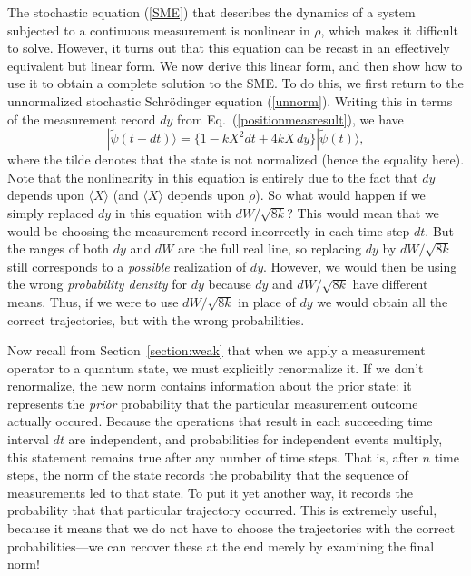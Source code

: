 \documentclass[12pt,aps,onecolum,superscriptaddress,footinbib,floatfix,showpacs]{revtex4-1}
\begin{document}
The stochastic equation (\ref{SME}) that describes the
dynamics of a system subjected to a continuous measurement is
nonlinear in $\rho$, which makes it difficult to solve. However, it turns
out that this equation can be recast in an effectively
equivalent but linear form. We now derive this linear form, and then show 
how to use it to obtain a complete solution to the SME. To do this, we first 
return to the unnormalized stochastic Schr\"{o}dinger 
equation (\ref{unnorm}). Writing this in terms of the measurement 
record $dy$ from Eq.~(\ref{positionmeasresult}), we have 
\begin{equation}
  |\tilde{\psi}(t+dt)\rangle =  \{ 1 -  k X^2 dt + 4kX\, dy  \}  |\tilde{\psi}(t)\rangle ,
  \label{unnorm2}
\end{equation}
where the tilde denotes that the state is not normalized (hence the 
equality here). 
Note that the nonlinearity 
in this equation is entirely due to the fact that 
$dy$ depends upon $\langle X \rangle$ 
(and $\langle X \rangle$ depends upon $\rho$). So what would 
happen if we simply replaced $dy$ in this equation with $dW/\sqrt{8k}$? 
This would mean that we would be choosing the measurement record
incorrectly in each time step $dt$.  
But the ranges of both $dy$ and $dW$ are the full real line, 
so replacing $dy$ by $dW/\sqrt{8k}$ still corresponds to 
a \textit{possible} realization of $dy$.  However, 
we would then be using the wrong \textit{probability density}
for $dy$ because $dy$ and $dW/\sqrt{8k}$ have different means.
Thus, if we were to use $dW/\sqrt{8k}$ in place of $dy$
we would obtain all the correct trajectories, but with the wrong
probabilities.

Now recall from Section~\ref{section:weak} that when we apply a
measurement operator to a quantum state, we must explicitly
renormalize it.  If we don't renormalize, the new norm contains
information about the prior state: it represents the 
\textit{prior} probability that the particular measurement outcome
actually occured.
Because the operations that result in each
succeeding time interval $dt$ are independent, and probabilities
for independent events multiply, this statement remains true after any number of
time steps.  That is, after $n$ time steps, the norm of the state
records the probability that the sequence of measurements led to that
state.  To put it yet another way, it records the probability that
that particular trajectory occurred.  This is extremely useful,
because it means that we do not have to choose the trajectories with
the correct probabilities---we can recover these at the end merely
by examining the final norm! 
\end{document}
